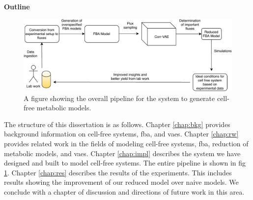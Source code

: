 \textbf{Outline}
\begin{figure}[t!]
\begin{center}
\includegraphics[width=\textwidth]{figs/SystemOverview.pdf}
\end{center}
\label{fig:overview}
\caption{A figure showing the overall pipeline for the system to generate cell-free metabolic models.}
\end{figure}

The structure of this dissertation is as follows.
Chapter \ref{chap:bkg} provides background information on cell-free systems, \gls{fba}, and \glspl{vae}.
Chapter \ref{chap:rw} provides related work in the fields of modeling cell-free systems, \gls{fba}, reduction of metabolic models, and \glspl{vae}.
Chapter \ref{chap:impl} describes the system we have designed and built to model cell-free systems.
The entire pipeline is shown in fig \ref{fig:overview}.
Chapter \ref{chap:res} describes the results of the experiments.
This includes results showing the improvement of our reduced model over naive models.
We conclude with a chapter of discussion and directions of future work in this area.
